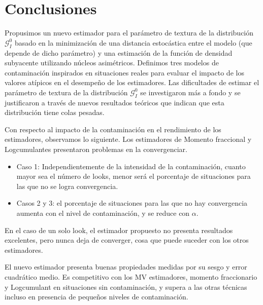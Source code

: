 
\chapter{Conclusiones}
\label{Conclusiones}

Propusimos un nuevo estimador para el parámetro de textura de la distribución $\mathcal{G}_I^0$ basado en la minimización de una distancia estocástica entre el modelo (que depende de dicho parámetro) y una estimación de la función de densidad subyacente utilizando núcleos asimétricos.
Definimos tres modelos de contaminación inspirados en situaciones reales para evaluar el impacto de los valores atípicos en el desempeño de los estimadores.
Las dificultades de estimar el parámetro de textura de la distribución $\mathcal{G}_I^0$ se investigaron más a fondo y se justificaron a través de nuevos resultados teóricos que indican que esta distribución tiene colas pesadas.

Con respecto al impacto de la contaminación en el rendimiento de los estimadores, observamos lo siguiente.
Los estimadores de Momento fraccional y Logcumulantes presentaron problemas en la convergenciar.

\begin {itemize}
	\item Caso 1: Independientemente de la intensidad de la contaminación, cuanto mayor sea el número de looks, menor será el porcentaje de situaciones para las que no se logra convergencia.
	\item Casos 2 y 3: el porcentaje de situaciones para las que no hay convergencia aumenta con el nivel de contaminación, y se reduce con $\alpha$.
\end {itemize}

En el caso de un solo look, el estimador propuesto no presenta resultados excelentes, pero nunca deja de converger, cosa que puede suceder con los otros estimadores.

El nuevo estimador presenta buenas propiedades medidas por su sesgo y error cuadrático medio. Es competitivo con los MV estimadores, momento fraccionario y Logcumulant en situaciones sin contaminación, y supera a las otras técnicas incluso en presencia de pequeños niveles de contaminación.

